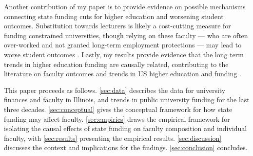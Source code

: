 Another contribution of my paper is to provide evidence on possible mechanisms connecting state funding cuts for higher education and worsening student outcomes.
Substitution towards lecturers is likely a cost-cutting measure for funding constrained universities, though relying on these faculty --- who are often over-worked and not granted long-term employment protections --- may lead to worse student outcomes \citep{ehrenberg2005tenured,zhu2021limited,jaeger2011examining}.
Lastly, my results provide evidence that the long term trends in higher education funding are causally related, contributing to the literature on faculty outcomes \citep{ehrenberg2003studying} and trends in US higher education and funding \citep{hoxby2009changing,ehrenberg2012american}.

This paper proceeds as follows.
\autoref{sec:data} describes the data for university finances and faculty in Illinois, and trends in public university funding for the last three decades.
\autoref{sec:conceptual} gives the conceptual framework for how state funding may affect faculty.
\autoref{sec:empirics} draws the empirical framework for isolating the causal effects of state funding on faculty composition and individual faculty, with \autoref{sec:results} presenting the empirical results.
\autoref{sec:discussion} discusses the context and implications for the findings.
\autoref{sec:conclusion} concludes.
